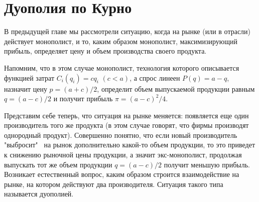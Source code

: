 \documentclass[12pt]{article}
\begin{document}
\newcommand{\be}{\begin{equation}}
\newcommand{\ee}{\end{equation}}
\renewcommand{\theequation}{\arabic{equation}}

\newcommand {\SC}{\succcurlyeq}
\newcommand {\GT}{\gtrsim}
\newcommand {\PR}{\precsim}
\newcommand {\UC}{\succsim}

\newcommand{\R}{{\rm I\!R}}
\newcommand{\B}{\hbox{\ms B}}
\newcommand{\Z}{\hbox{\ms Z}}

\newcommand{\bc}{\begin{center}}
\newcommand{\ec}{\end{center}}




\newtheorem{theorem}{Теорема}
\newtheorem{lemma}{Лемма}
\newtheorem{corollary}{Следствие}
\newtheorem{definition}{Определение}
\newtheorem{proposition}{Предложение}


\makeatletter
{}
\makeatother

\renewcommand{\thesection}{\arabic{section}.}



\section{Дуополия по Курно}

В предыдущей главе мы рассмотрели ситуацию, когда на рынке (или в
отрасли) действует монополист, и то, каким образом монополист,
максимизирующий прибыль, определяет цену и объем
производства своего продукта.

Напомним, что в этом случае монополист, технология которого
описывается функцией затрат $C_i(q_i)=cq_i$ $(c<a)$, а спрос линеен
$P(q)=a-q$, назначит цену $p=(a+c)/2$, определит объем выпускаемой
продукции равным $q=(a-c)/2$ и получит прибыль $\pi = (a-c)^2/4$.

Представим себе теперь, что ситуация на рынке меняется: появляется
еще один производитель того же продукта (в этом случае говорят, что
фирмы производят однородный продукт). Совершенно понятно, что если
новый производитель "выбросит" \, на рынок дополнительно какой-то объем
продукции, то это приведет к снижению рыночной цены продукции, а
значит экс-монополист, продолжая выпускать тот же объем продукции
$q=(a-c)/2$ получит меньшую прибыль. Возникает естественный вопрос,
каким образом строится взаимодействие на рынке, на котором действуют
два производителя. Ситуация такого типа называется дуополией.
\end{document}
